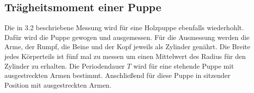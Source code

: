    \subsection{Trägheitsmoment einer Puppe}

      Die in 3.2 beschriebene Messung wird für eine Holzpuppe ebenfalls wiederhohlt.
      Dafür wird die Puppe gewogen und ausgemessen.
      Für die Ausmessung werden die Arme, der Rumpf, die Beine und der Kopf
      jeweils als Zylinder genährt.
      Die Breite jedes Körperteils ist fünf mal zu messen um einen Mittelwert
      des Radius für den Zylinder zu erhalten.
      Die Periodendauer $T$ wird für eine stehende Puppe mit ausgestreckten Armen bestimmt.
      Anschließend für diese Puppe in sitzender Position mit ausgestreckten Armen.

